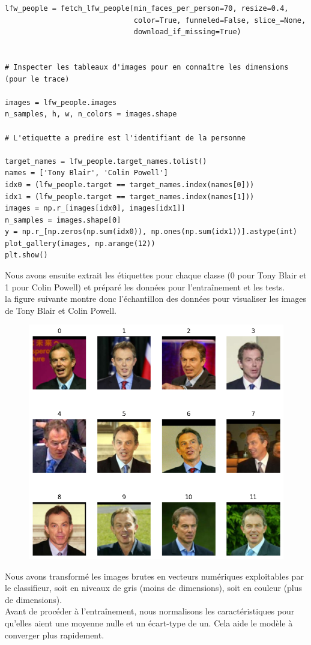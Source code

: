 \documentclass[12pt,a4paper]{report}
\begin{document}
\begin{lstlisting}
lfw_people = fetch_lfw_people(min_faces_per_person=70, resize=0.4,
                              color=True, funneled=False, slice_=None,
                              download_if_missing=True)


# Inspecter les tableaux d'images pour en connaître les dimensions (pour le trace)

images = lfw_people.images
n_samples, h, w, n_colors = images.shape

# L'etiquette a predire est l'identifiant de la personne

target_names = lfw_people.target_names.tolist()
names = ['Tony Blair', 'Colin Powell']
idx0 = (lfw_people.target == target_names.index(names[0]))
idx1 = (lfw_people.target == target_names.index(names[1]))
images = np.r_[images[idx0], images[idx1]]
n_samples = images.shape[0]
y = np.r_[np.zeros(np.sum(idx0)), np.ones(np.sum(idx1))].astype(int)
plot_gallery(images, np.arange(12))
plt.show()
\end{lstlisting}

 Nous avons ensuite extrait les étiquettes pour chaque classe (0 pour Tony Blair
 et 1 pour Colin Powell) et préparé les données pour l’entraînement et les tests.\\
 la figure suivante montre donc l’échantillon des données pour visualiser les images de Tony Blair et Colin Powell.
 
 \begin{figure}[H]
     \centering
\includegraphics[width=0.9\linewidth]{images/faces.png}
     \caption{}
     \label{fig:placeholder}
 \end{figure}
 Nous avons transformé les images brutes en vecteurs numériques exploitables par le classifieur, soit en niveaux de gris (moins de dimensions), soit en couleur (plus de dimensions). \\
 Avant de procéder à l’entraînement, nous normalisons les caractéristiques pour qu’elles aient
 une moyenne nulle et un écart-type de un. Cela aide le modèle à converger plus rapidement.
 
\end{document}
